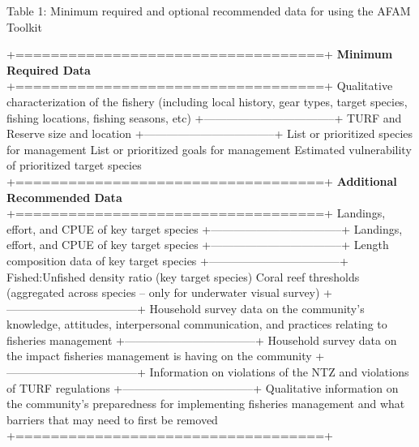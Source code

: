 \documentclass[]{book}
\begin{document}
Table 1: Minimum required and optional recommended data for using the
AFAM Toolkit

+===================================+ \textbar{} \textbf{Minimum
Required Data} \textbar{} +===================================+
\textbar{} Qualitative characterization of \textbar{} \textbar{} the
fishery (including local \textbar{} \textbar{} history, gear types,
target \textbar{} \textbar{} species, fishing locations, \textbar{}
\textbar{} fishing seasons, etc) \textbar{}
+-----------------------------------+ \textbar{} TURF and Reserve size
and \textbar{} \textbar{} location \textbar{} \textbar{} \textbar{}
+-----------------------------------+ \textbar{} List or prioritized
species for \textbar{} \textbar{} management \textbar{} \textbar{}
\textbar{} \textbar{} List or prioritized goals for \textbar{}
\textbar{} management \textbar{} \textbar{} \textbar{} \textbar{}
Estimated vulnerability of \textbar{} \textbar{} prioritized target
species \textbar{} +===================================+
\textbar{}\textbf{Additional Recommended Data} \textbar{}
+===================================+ \textbar{} Landings, effort, and
CPUE of key \textbar{} \textbar{} target species \textbar{}
+-----------------------------------+ \textbar{} Landings, effort, and
CPUE of key \textbar{} \textbar{} target species \textbar{}
+-----------------------------------+ \textbar{} Length composition data
of key \textbar{} \textbar{} target species \textbar{}
+-----------------------------------+ \textbar{} Fished:Unfished density
ratio \textbar{} \textbar{} (key target species) Coral reef \textbar{}
\textbar{} thresholds (aggregated across \textbar{} \textbar{} species
-- only for underwater \textbar{} \textbar{} visual survey) \textbar{}
+-----------------------------------+ \textbar{} Household survey data
on the \textbar{} \textbar{} community's knowledge, attitudes,
\textbar{} \textbar{} interpersonal communication, and \textbar{}
\textbar{} practices relating to fisheries \textbar{} \textbar{}
management \textbar{} +-----------------------------------+ \textbar{}
Household survey data on the \textbar{} \textbar{} impact fisheries
management is \textbar{} \textbar{} having on the community \textbar{}
+-----------------------------------+ \textbar{} Information on
violations of the \textbar{} \textbar{} NTZ and violations of TURF
\textbar{} \textbar{} regulations \textbar{}
+-----------------------------------+ \textbar{} Qualitative information
on the \textbar{} \textbar{} community's preparedness for \textbar{}
\textbar{} implementing fisheries management \textbar{} \textbar{} and
what barriers that may need \textbar{} \textbar{} to first be removed
\textbar{} +===================================+
\end{document}

